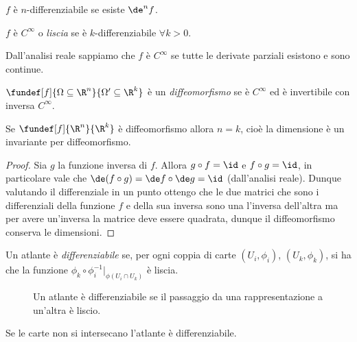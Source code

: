 \begin{defn}
	$f$ è $n$-differenziabile se esiste $\de^n f$.
\end{defn}

\begin{defn}
	$f$ è $C^{\infty}$ o \emph{liscia} se è $k$-differenziabile $\forall k > 0$.
\end{defn}

\begin{fat}
	Dall'analisi reale sappiamo che $f$ è $C^{\infty}$
	se tutte le derivate parziali esistono e sono continue.
\end{fat}

\begin{defn}[Diffeomorfismo]
	$\fundef[f]{\Omega \subseteq \R^n}{\Omega' \subseteq \R^k}$ è un \emph{diffeomorfismo}
	se è $C^\infty$ ed è invertibile con inversa $C^{\infty}$.
\end{defn}

\begin{prop}
	Se $\fundef[f]{\R^n}{\R^k}$ è diffeomorfismo allora $n = k$,
	cioè la dimensione è un invariante per diffeomorfismo.
\end{prop}

\begin{proof}
	Sia $g$ la funzione inversa di $f$.
	Allora $g \circ f = \id$ e $f \circ g = \id$,
	in particolare vale che $\de(f \circ g) = \de f \circ \de g = \id$ (dall'analisi reale).
	Dunque valutando il differenziale in un punto ottengo che le due matrici
	che sono i differenziali della funzione $f$ e della sua inversa
	sono una l'inversa dell'altra ma per avere un'inversa la matrice deve essere quadrata,
	dunque il diffeomorfismo conserva le dimensioni.
\end{proof}

\begin{defn}
	Un atlante è \emph{differenziabile} se,
	per ogni coppia di carte $(U_i,\phi_i)$, $(U_k,\phi_k)$, si ha che la funzione
	$\phi_k\circ\phi_i^{-1}|_{\phi(U_i\cap U_k)}$ è liscia.\footnotemark
	\begin{figure}
    \centering
    
    \caption{Un atlante è differenziabile se il passaggio da una rappresentazione a un'altra è liscio.}
	\end{figure}
\end{defn}

\begin{oss}
	Se le carte non si intersecano l'atlante è differenziabile.
\end{oss}

